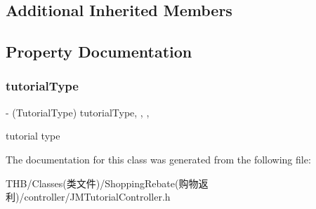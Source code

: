 \subsection*{Additional Inherited Members}


\subsection{Property Documentation}
\mbox{\label{interface_j_m_tutorial_controller_aaf55822e77a3675e64f71078d6000acf}} 
\subsubsection{\texorpdfstring{tutorial\+Type}{tutorialType}}
{\footnotesize\ttfamily -\/ (Tutorial\+Type) tutorial\+Type\hspace{0.3cm}{\ttfamily [read]}, {\ttfamily [write]}, {\ttfamily [nonatomic]}, {\ttfamily [assign]}}

tutorial type 

The documentation for this class was generated from the following file\+:\begin{DoxyCompactItemize}
\item 
T\+H\+B/\+Classes(类文件)/\+Shopping\+Rebate(购物返利)/controller/J\+M\+Tutorial\+Controller.\+h\end{DoxyCompactItemize}
